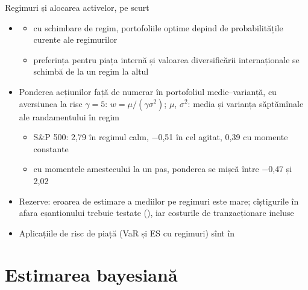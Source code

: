 \begin{frame}{Regimuri și alocarea activelor, pe scurt}
\itemsize{\small}
\begin{itemize}
    \item {}
    \begin{itemize}
        \item cu schimbare de regim, portofoliile optime depind de probabilitățile curente ale regimurilor
        \item preferința pentru piața internă și valoarea diversificării internaționale se schimbă de la un regim la altul
    \end{itemize}
    \item Ponderea acțiunilor față de numerar în portofoliul medie--varianță, cu aversiunea la risc $\gamma = 5$: $w = \mu/(\gamma\sigma^2)$; $\mu$, $\sigma^2$: media și varianța săptămînale ale randamentului în regim
    \begin{itemize}
        \item S\&P 500: 2{,}79 în regimul calm, \ensuremath{-}0{,}51 în cel agitat, 0{,}39 cu momente constante
        \item cu momentele amestecului la un pas, ponderea se mișcă între \ensuremath{-}0{,}47 și 2{,}02
    \end{itemize}
    \item Rezerve: eroarea de estimare a mediilor pe regimuri este mare; cîștigurile în afara eșantionului trebuie testate (), iar costurile de tranzacționare incluse
    \item Aplicațiile de risc de piață (VaR și ES cu regimuri) sînt în 
\end{itemize}
\end{frame}


\section{Estimarea bayesiană}

